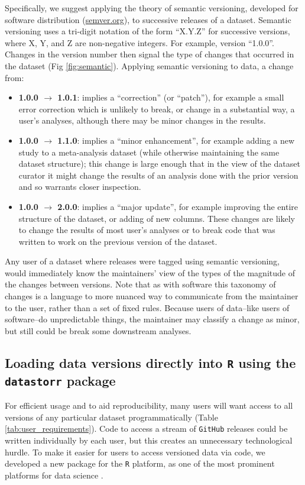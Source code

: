 \documentclass[a4paper,num-refs]{assets/oup-contemporary}
\begin{document}
Specifically, we suggest applying the theory of semantic versioning, developed for software distribution (\href{http://semver.org/}{semver.org}), to successive releases of a dataset. Semantic versioning uses a tri-digit notation of the form ``X.Y.Z'' for successive versions, where X, Y, and Z are non-negative integers. For example, version ``1.0.0''. Changes in the version number then signal the type of changes that occurred in the dataset (Fig \ref{fig:semantic}). Applying semantic versioning to data, a change from:
\begin{itemize}
  \item {\bf 1.0.0 $\rightarrow$ 1.0.1}: implies a ``correction'' (or ``patch''), for example a small error correction which is unlikely to break, or change in a substantial way, a user's analyses, although there may be minor changes in the results.
  \item {\bf 1.0.0 $\rightarrow$ 1.1.0}: implies a ``minor enhancement'', for example adding a new study to a meta-analysis dataset (while otherwise maintaining the same dataset structure); this change is large enough that in the view of the dataset curator it might change the results of an analysis done with the prior version and so warrants closer inspection.
  \item {\bf 1.0.0 $\rightarrow$ 2.0.0}: implies a ``major update'', for example improving the entire structure of the dataset, or adding of new columns. These changes are likely to change the results of most user's analyses or to break code that was written to work on the previous version of the dataset.
\end{itemize}
Any user of a dataset where releases were tagged using semantic versioning, would immediately know the maintainers' view of the types of the magnitude of the changes between versions.  Note that as with software this taxonomy of changes is a language to more nuanced way to communicate from the maintainer to the user, rather than a set of fixed rules. Because users of data--like users of software--do unpredictable things, the maintainer may classify a change as minor, but still could be break some downstream analyses.  

\subsection{Loading data versions directly into \texttt{R} using the \texttt{datastorr} package}

For efficient usage and to aid reproducibility, many users will want access to all versions of any particular dataset programmatically (Table \ref{tab:user_requirements}). Code to access a stream of \texttt{GitHub} releases could be written individually by each user, but this creates an unnecessary technological hurdle. To make it easier for users to access versioned data via code, we developed a new package for the \texttt{R} platform, as one of the most prominent platforms for data science \cite{R-2017}.
\end{document}
